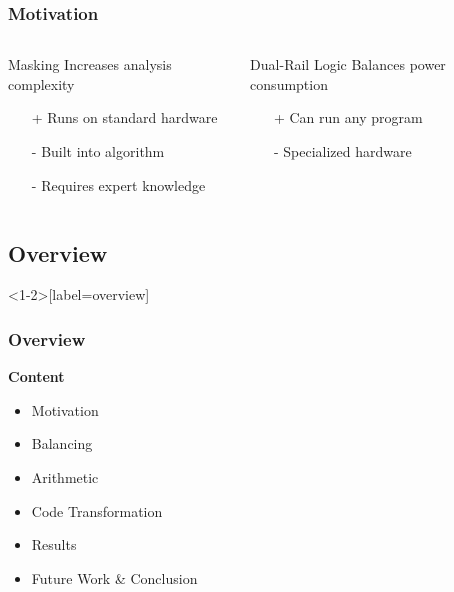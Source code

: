 \documentclass[11pt,t,usepdftitle=false,aspectratio=169]{beamer}
\newcommand{\vq}{\vphantom{q}}
\begin{document}
\begin{frame}
  \frametitle{Motivation}
  \vfill
  \begin{columns}[T]
    \begin{column}{0.48\textwidth}
      \begin{block}{Masking}
        Increases analysis complexity
        \begin{itemize}
        \item[+] Runs on standard hardware
        \item[-] Built into algorithm
        \item[-] Requires expert knowledge
        \end{itemize}
      \end{block}
    \end{column}
    \begin{column}{0.48\textwidth}
      \begin{block}{Dual-Rail Logic}
        Balances power consumption
        \begin{itemize}
        \item[+] Can run any program
        \item[-] Specialized hardware
        \item[] \vq
        \end{itemize}
      \end{block}
    \end{column}
  \end{columns}
  \vfill
  \vfill
\end{frame}

\subsection{Overview}

\begin{frame}<1-2>[label=overview]
  \frametitle{Overview}
  \vfill
  \textbf{Content}

  \begin{itemize}
  \item Motivation
  \item \textcolor<2>{uibkorange}{Balancing}
  \item \textcolor<3>{uibkorange}{Arithmetic}
  \item \textcolor<4>{uibkorange}{Code Transformation}
  \item \textcolor<5>{uibkorange}{Results}
  \item \textcolor<6>{uibkorange}{Future Work \& Conclusion}
  \end{itemize}
  \vfill
\end{frame}
\end{document}
